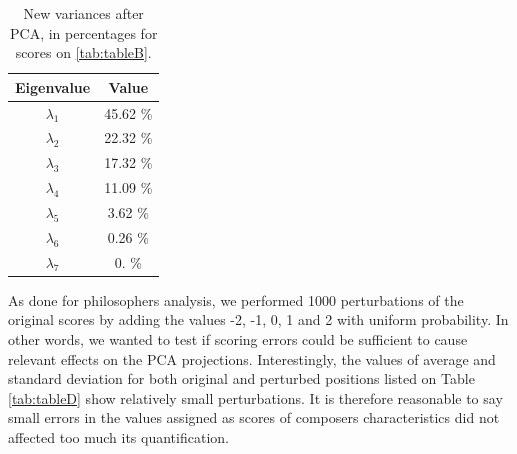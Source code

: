 \documentclass[
 aip,
 jmp,
 amsmath,amssymb,
 reprint,
]{revtex4-1}
\begin{document}
\begin{table}[ht]
\caption{\label{tab:tableC}New variances after PCA, in percentages for
  scores on \ref{tab:tableB}.}

\begin{tabular}{|c||c|}
\hline
Eigenvalue  & Value     \\ \hline

$\lambda_1$ &  45.62 \% \\
$\lambda_2$ &  22.32 \% \\
$\lambda_3$ &  17.32 \% \\
$\lambda_4$ &  11.09 \% \\
$\lambda_5$ &   3.62 \% \\
$\lambda_6$ &   0.26 \% \\
$\lambda_7$ &   0.   \% \\
\hline

\end{tabular}
\end{table}

As done for philosophers analysis, we performed 1000 perturbations of
the original scores by adding the values -2, -1, 0, 1 and 2 with
uniform probability. In other words, we wanted to test if scoring
errors could be sufficient to cause relevant effects
on the PCA projections. Interestingly, the values of average and
standard deviation for both original and perturbed positions listed on Table
\ref{tab:tableD} show relatively small perturbations. It is therefore
reasonable to say small errors in the values assigned as scores of composers
characteristics did not affected too much its quantification.

\end{document}
